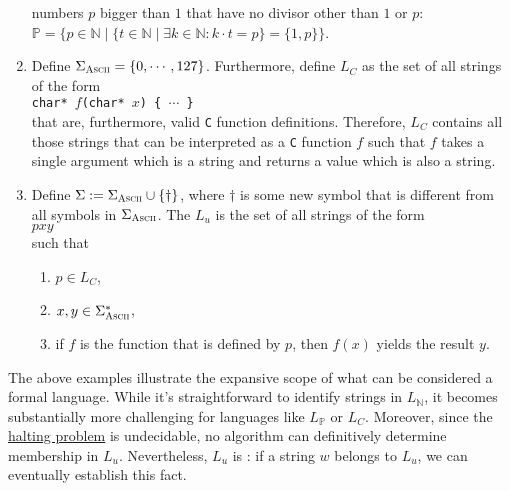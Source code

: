 \begin{enumerate}
      numbers $p$ bigger than $1$ that have no divisor other than $1$ or $p$:
      \\[0.2cm]
      \hspace*{1.3cm}
      $\mathbb{P} = \bigl\{ p \in \mathbb{N} \;\big|\; \{ t \in \mathbb{N} \mid \exists k \in
      \mathbb{N} : k \cdot t = p \} = \{1, p\} \bigr\}$.
\item Define $\Sigma_{\textsc{\scriptsize Ascii}} = \{ 0, \cdots, 127\}$.  Furthermore, define $L_C$
      as the set of all strings of the form
      \\[0.2cm]
      \hspace*{1.3cm}
      \texttt{char* $f$(char* $x$) \{ $\cdots$ \}}
      \\[0.2cm]
      that are, furthermore, valid \texttt{C} function definitions.
      Therefore,  $L_C$ contains all those strings that can be interpreted as a \texttt{C} function $f$
      such that $f$ takes a single argument which is a string and returns a value which is also a
      string.
\item Define $\Sigma := \Sigma_{\textsc{\scriptsize Ascii}} \cup \{\dag\}$, where
      $\mathtt{\dag}$ is some new symbol that is different from all symbols in
      $\Sigma_{\textsc{\scriptsize Ascii}}$.
      The   $L_u$ is the set of all strings of the form
      \\[0.2cm]
      \hspace*{1.3cm}
      $p$\dag$x$\dag$y$
      \\[0.2cm]
      such that
      \begin{enumerate}
      \item $p \in L_C$,
      \item $x,y \in \Sigma_{\textsc{Ascii}}^*$,
      \item if $f$ is the function that is defined by $p$, then $f(x)$ yields the result $y$.
            \eox
      \end{enumerate}
    \end{enumerate}

The above examples illustrate the expansive scope of what can be considered a formal language. While it's
straightforward to identify strings in \( L_\mathbb{N} \), it becomes substantially more challenging for
languages like \( L_\mathbb{P} \) or \( L_C \). Moreover, since the
\href{https://en.wikipedia.org/wiki/Halting_problem}{halting problem} is undecidable, no algorithm can
definitively determine membership in \( L_u \). Nevertheless, \( L_u \) is : if a string
\( w \) belongs to \( L_u \), we can eventually establish this fact.  

